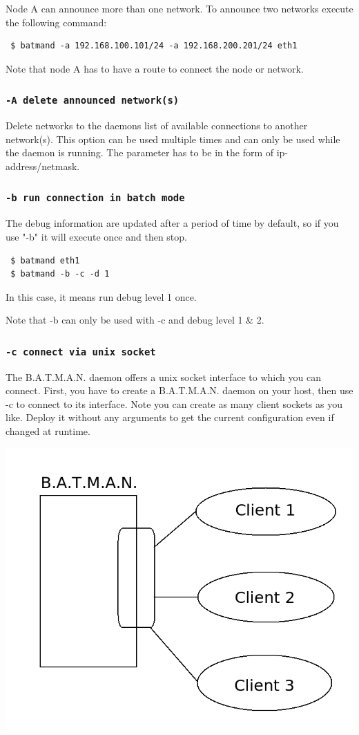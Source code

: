 \documentclass[
	12pt,
	a4paper,
	twoside,
	english,
	headsepline,
	footnosepline,
	automark,
	normalheadings,
	openany,
	cleardoubleplain,
	abstracton,
	idxtotoc,
	liststotoc,
	bibtotoc,
 	BCOR8mm,
]{scrartcl}
\newcommand{\subsubsectionttt}[1]{\subsubsection{\texttt{#1}}}
\begin{document}
Node A can announce more than one network. To announce two networks execute the
following command:
\begin{verbatim}
 $ batmand -a 192.168.100.101/24 -a 192.168.200.201/24 eth1
\end{verbatim}
Note that node A has to have a route to connect the node or network.

\subsubsectionttt{-A delete announced network(s)}
Delete networks to the daemons list of available connections to another
network(s). This option can be used multiple times and can only be used while
the daemon is running. The parameter has to be in the form of
ip-address/netmask.

\subsubsectionttt{-b run connection in batch mode}
The debug information are updated after a period of time by default, so if you
use "-b" it will execute once and then stop.
\begin{verbatim}
 $ batmand eth1
 $ batmand -b -c -d 1
\end{verbatim}
In this case, it means run debug level 1 once.

Note that -b can only be used with -c and debug level 1 \& 2.

\subsubsectionttt{-c connect via unix socket}
The B.A.T.M.A.N. daemon offers a unix socket interface to which you can connect.
First, you have to create a B.A.T.M.A.N. daemon on your host, then use -c to
connect to its interface. Note you can create as many client sockets as you
like.
Deploy it without any arguments to get the current configuration even if changed
at runtime.

\begin{center}
\includegraphics[scale=0.25]{multiple_clients}
\end{center}
\end{document}
